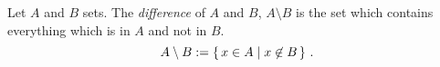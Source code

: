 \guard



\begin{defn}
\label{defn:difference}
  Let $A$ and $B$ sets.
  The \emph{difference} of $A$ and $B$, $A\setminus B$ is the set which contains everything which is in $A$ and not in $B$.
  \[ A\setminus B := \left\{\, x \in A \mid x\not\in B\,\right\}\,.\]
\end{defn}
